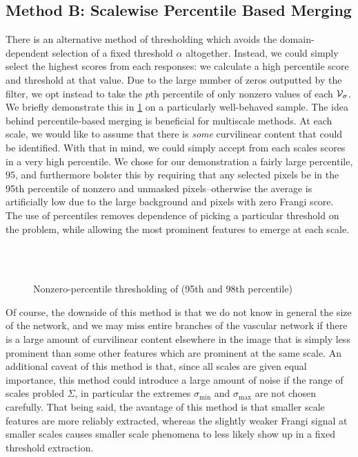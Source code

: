 \subsection{Method B: Scalewise Percentile Based Merging}

There is an alternative method of thresholding which avoids the domain-dependent selection of a fixed threshold $\alpha$ altogether. Instead, we could simply select the highest scores from each responses: we calculate a high percentile score and threshold at that value. Due to the large number of zeros outputted by the filter, we opt instead to take the $p$th percentile of only nonzero values of each $\mathcal{V}_{\sigma}$. 
We briefly demonstrate this in \cref{fig:qthresh_demo} on a particularly well-behaved sample. The idea behind percentile-based merging is beneficial for multiscale methods. At each scale, we would like to assume that there is \textit{some} curvilinear content that could be identified. With that in mind, we could simply accept from each scales scores in a very high percentile. We chose for our demonstration a fairly large percentile, $95$, and furthermore bolster this by requiring that any selected pixels be in the 95th percentile of nonzero and unmasked pixels--otherwise the average is artificially low due to the large background and pixels with zero Frangi score. The use of percentiles removes dependence of picking a particular threshold on the problem, while allowing the most prominent features to emerge at each scale.

\begin{figure} \centering
	 \\
	 \\
	\caption{Nonzero-percentile thresholding of \Vmax (95th and 98th percentile)}
	\label{fig:qthresh_demo}
\end{figure}

Of course, the downside of this method is that we do not know in general the size of the network, and  we may miss entire branches of the vascular network if there is a large amount of curvilinear content elsewhere in the image that is simply less prominent than some other features which are prominent at the same scale. An additional caveat of this method is that, since all scales are given equal importance, this method could introduce a large amount of noise if the range of scales probled $\Sigma$, in particular the extremes $\sigma_{\min}$ and $\sigma_{\max}$ are not chosen carefully. That being said, the avantage of this method is that smaller scale features are more reliably extracted, whereas the slightly weaker Frangi signal at smaller scales causes smaller scale phenomena to less likely show up in a fixed threshold extraction.




